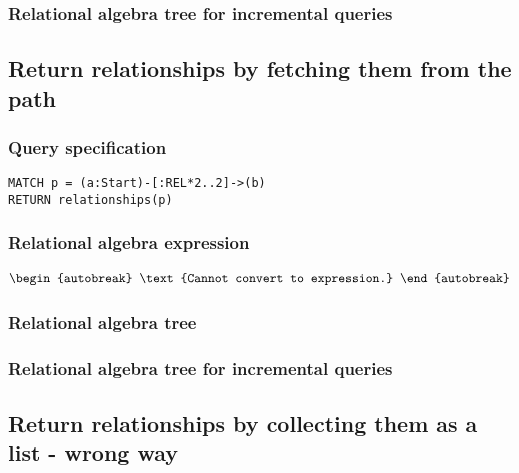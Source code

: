 \subsubsection*{Relational algebra tree for incremental queries}


\subsection{Return relationships by fetching them from the path}

\subsubsection*{Query specification}

\begin{lstlisting}
MATCH p = (a:Start)-[:REL*2..2]->(b)
RETURN relationships(p)
\end{lstlisting}

\subsubsection*{Relational algebra expression}

\begin{align*}
\begin{autobreak}
\text{Cannot convert to expression.}
\end{autobreak}
\end{align*}

\subsubsection*{Relational algebra tree}


\subsubsection*{Relational algebra tree for incremental queries}


\subsection{Return relationships by collecting them as a list - wrong way}

